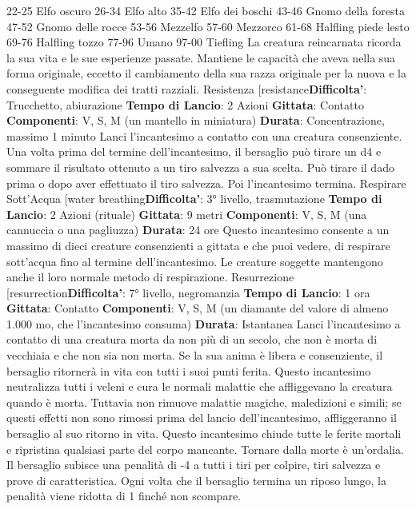 \begin{multicols}{2}
22-25 Elfo oscuro
26-34 Elfo alto
35-42 Elfo dei boschi
43-46 Gnomo della foresta
47-52 Gnomo delle rocce
53-56 Mezzelfo
57-60 Mezzorco
61-68 Halfling piede lesto
69-76 Halfling tozzo
77-96 Umano
97-00 Tiefling
La creatura reincarnata ricorda la sua vita e le sue
esperienze passate. Mantiene le capacità che aveva
nella sua forma originale, eccetto il cambiamento della
sua razza originale per la nuova e la conseguente
modifica dei tratti razziali.
Resistenza
[resistance\textbf{Difficolta'}:
Trucchetto, abiurazione
\textbf{Tempo di Lancio}: 2 Azioni
\textbf{Gittata}: Contatto
\textbf{Componenti}: V, S, M (un mantello in miniatura)
\textbf{Durata}: Concentrazione, massimo 1 minuto
Lanci l’incantesimo a contatto con una creatura
consenziente. Una volta prima del termine
dell’incantesimo, il bersaglio può tirare un d4 e
sommare il risultato ottenuto a un tiro salvezza a sua
scelta. Può tirare il dado prima o dopo aver effettuato il
tiro salvezza. Poi l’incantesimo termina.
Respirare Sott’Acqua
[water breathing\textbf{Difficolta'}:
3° livello, trasmutazione
\textbf{Tempo di Lancio}: 2 Azioni (rituale)
\textbf{Gittata}: 9 metri
\textbf{Componenti}: V, S, M (una cannuccia o una pagliuzza)
\textbf{Durata}: 24 ore
Questo incantesimo consente a un massimo di dieci
creature consenzienti a gittata e che puoi vedere, di
respirare sott’acqua fino al termine dell’incantesimo. Le
creature soggette mantengono anche il loro normale
metodo di respirazione.
Resurrezione
[resurrection\textbf{Difficolta'}:
7° livello, negromanzia
\textbf{Tempo di Lancio}: 1 ora
\textbf{Gittata}: Contatto
\textbf{Componenti}: V, S, M (un diamante del valore di
almeno 1.000 mo, che l’incantesimo consuma)
\textbf{Durata}: Istantanea
Lanci l’incantesimo a contatto di una creatura morta da
non più di un secolo, che non è morta di vecchiaia e
che non sia non morta. Se la sua anima è libera e
consenziente, il bersaglio ritornerà in vita con tutti i suoi
punti ferita.
Questo incantesimo neutralizza tutti i veleni e cura le
normali malattie che affliggevano la creatura quando è
morta. Tuttavia non rimuove malattie magiche,
maledizioni e simili; se questi effetti non sono rimossi
prima del lancio dell’incantesimo, affliggeranno il
bersaglio al suo ritorno in vita.
Questo incantesimo chiude tutte le ferite mortali e
ripristina qualsiasi parte del corpo mancante.
Tornare dalla morte è un’ordalia. Il bersaglio subisce
una penalità di -4 a tutti i tiri per colpire, tiri salvezza e
prove di caratteristica. Ogni volta che il bersaglio
termina un riposo lungo, la penalità viene ridotta di 1
finché non scompare.

\end{multicols}
